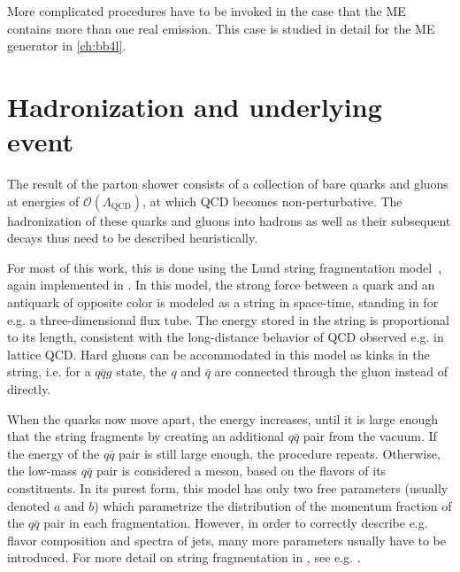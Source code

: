 More complicated procedures have to be invoked in the case that the ME contains more than one real emission. This case is studied in detail for the ME generator \bbfourl in \cref{ch:bb4l}.




\section{Hadronization and underlying event}
\label{sec:mc:hadronization}

The result of the parton shower consists of a collection of bare quarks and gluons at energies of $\mathcal{O}(\Lambda_{\mathrm{QCD}})$, at which QCD becomes non-perturbative. The hadronization of these quarks and gluons into hadrons as well as their subsequent decays thus need to be described heuristically.

For most of this work, this is done using the Lund string fragmentation model~\cite{Andersson:1983ia,Sjostrand:1984ic}, again implemented in \pythia. In this model, the strong force between a quark and an antiquark of opposite color is modeled as a string in space-time, standing in for e.g. a three-dimensional flux tube. The energy stored in the string is proportional to its length, consistent with the long-distance behavior of QCD observed e.g. in lattice QCD. Hard gluons can be accommodated in this model as kinks in the string, i.e. for a $q\bar{q}g$ state, the $q$ and $\bar{q}$ are connected through the gluon instead of directly.

When the quarks now move apart, the energy increases, until it is large enough that the string fragments by creating an additional $q\bar{q}$ pair from the vacuum. If the energy of the $q\bar{q}$ pair is still large enough, the procedure repeats. Otherwise, the low-mass $q\bar{q}$ pair is considered a meson, based on the flavors of its constituents. In its purest form, this model has only two free parameters (usually denoted $a$ and $b$) which parametrize the distribution of the momentum fraction of the $q\bar{q}$ pair in each fragmentation. However, in order to correctly describe e.g. flavor composition and \pt spectra of jets, many more parameters usually have to be introduced. For more detail on string fragmentation in \pythia, see e.g. .

